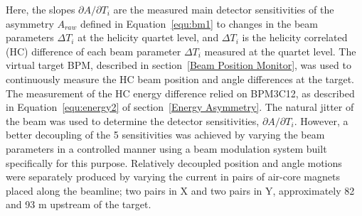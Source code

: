 Here, the slopes $\partial A /\partial T_{i}$ are the measured main detector sensitivities of the asymmetry $A_{raw}$ defined in Equation~\ref{equ:bm1} to changes in the beam parameters $\Delta T_{i}$ at the helicity quartet level, and $\Delta T_{i}$ is the helicity correlated (HC) difference of each beam parameter $\Delta T_{i}$ measured at the quartet level. The virtual target BPM, described in section~\ref{Beam Position Monitor}, was used to continuously measure the HC beam position and angle differences at the target. The measurement of the HC energy difference relied on BPM3C12, as described in Equation~\ref{equ:energy2} of section~\ref{Energy Asymmetry}. The natural jitter of the beam was used to determine the detector sensitivities, $\partial A /\partial T_{i}$. However, a better decoupling of the 5 sensitivities was achieved by varying the beam parameters in a controlled manner using a beam modulation system built specifically for this purpose. Relatively decoupled position and angle motions were separately produced by varying the current in pairs of air-core magnets placed along the beamline; two pairs in X and two pairs in Y, approximately 82 and 93 m upstream of the target. 


